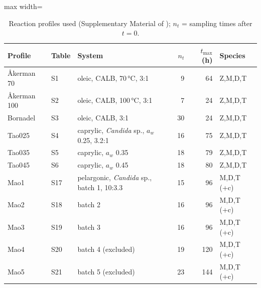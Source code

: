 \begin{table}[t]
\centering
\caption{Reaction profiles used (Supplementary Material of \cite{nishimura2026}); $n_t$ = sampling times after $t=0$.}\label{tab:data}
\footnotesize
\begin{adjustbox}{max width=\linewidth}
\begin{tabular}{lllrrl}
\toprule
Profile & Table & System & $n_t$ & $t_\mathrm{max}$ (h) & Species \\
\midrule
Åkerman 70 & S1 & oleic, CALB, 70\,°C, 3:1 & 9 & 64 & Z,M,D,T \\
Åkerman 100 & S2 & oleic, CALB, 100\,°C, 3:1 & 7 & 24 & Z,M,D,T \\
Bornadel & S3 & oleic, CALB, 3:1 & 30 & 24 & Z,M,D,T \\
Tao025 & S4 & caprylic, \emph{Candida} sp., $a_w$ 0.25, 3.2:1 & 16 & 75 & Z,M,D,T \\
Tao035 & S5 & caprylic, $a_w$ 0.35 & 18 & 79 & Z,M,D,T \\
Tao045 & S6 & caprylic, $a_w$ 0.45 & 18 & 80 & Z,M,D,T \\
Mao1 & S17 & pelargonic, \emph{Candida} sp., batch 1, 10:3.3 & 15 & 96 & M,D,T (+c) \\
Mao2 & S18 & batch 2 & 16 & 96 & M,D,T (+c) \\
Mao3 & S19 & batch 3 & 16 & 96 & M,D,T (+c) \\
Mao4 & S20 & batch 4 (excluded) & 19 & 120 & M,D,T (+c) \\
Mao5 & S21 & batch 5 (excluded) & 23 & 144 & M,D,T (+c) \\
\bottomrule
\end{tabular}
\end{adjustbox}
\end{table}

